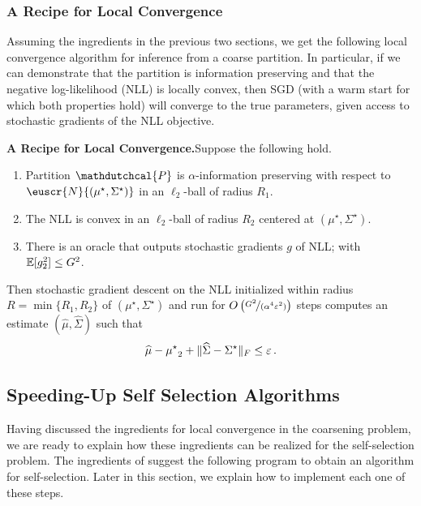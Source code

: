 \documentclass[11pt,letterpaper]{article}
\theoremstyle{plain}
\theoremstyle{definition}
\theoremstyle{remark}
\newcommand{\sinparen}[1]{\ensuremath{(#1)}}
\newcommand{\inparen}[1]{\ensuremath{\left(#1\right)}}
\newcommand{\snorm}[1]{\ensuremath{\ensuremath{\| #1 \|}}}
\let\norm\relax
\newcommand{\norm}[1]{\ensuremath{\left\lVert #1 \right\rVert}}
\newcommand{\E}{\operatornamewithlimits{\mathbb{E}}}
\newcommand{\Ex}{\E}
\newcommand{\nfrac}[2]{\nicefrac{#1}{#2}}
\newcommand{\eps}{\varepsilon}
\newcommand{\wh}[1]{\widehat{#1}}
\newcommand{\customcal}[1]{\euscr{#1}}
\newcommand{\cN}{\customcal{N}}
\newcommand{\hypo}[1]{\mathdutchcal{#1}}
\newcommand{\hyP}{\hypo{P}}
\newcommand{\normal}[2]{\cN{\inparen{#1,#2}}}
\newcommand{\muStar}{{\mu^\star}}
\newcommand{\SigmaStar}{{\Sigma^\star}}
\newcommand{\negsep}{\vspace{0mm}}
\begin{document}
\subsubsection{A Recipe for Local Convergence}\label{sec:localConvReceipe}
    Assuming the ingredients in the previous two sections, we get the following local convergence algorithm for inference from a coarse partition.
   In particular, if we can demonstrate that the partition is information preserving and that the negative log-likelihood (NLL) is locally convex, then SGD (with a warm start for which both properties hold) will converge to the true parameters, given access to stochastic gradients of the NLL objective.
    \begin{mdframed}
        \textbf{A Recipe for Local Convergence.}\quad Suppose the following hold.
        \vspace{-2mm}
        \begin{enumerate}[itemsep=-1.5pt,leftmargin=12pt]
            \item Partition $\hyP$ is $\alpha$-information preserving with respect to $\normal{\mu^\star}{\SigmaStar}$ in an $\ell_2$-ball of radius $R_{1}.$
            \item The NLL is convex in an $\ell_2$-ball of radius $R_2$ centered at $(\mu^\star, \SigmaStar)$.
            \item There is an oracle that outputs stochastic gradients $g$ of NLL; with $\Ex[\norm{g}_2^2]\leq G^2$. 
        \end{enumerate}
        Then stochastic gradient descent on the NLL initialized within radius $R  = \min\{R_1,R_2\}$ of $\inparen{\muStar,\SigmaStar}$
        and run for $O\inparen{\nfrac{G^2}{(\alpha^4\eps^2)}}$ steps
        computes an estimate $\sinparen{\wh{\mu},\wh{\Sigma}}$ such that 
        \[
            \norm{\wh{\mu} - \muStar}_2 + \snorm{\wh{\Sigma} - \SigmaStar}_F \leq \eps\,.
        \]
    \end{mdframed}

\negsep{}

\subsection{Speeding-Up Self Selection Algorithms}
\label{sec:reduction}   
{Having discussed the ingredients for local convergence in the coarsening problem}, we are ready to explain how these ingredients can be realized for the self-selection problem. The ingredients of  suggest the following program to obtain an algorithm for self-selection. 
Later in this section, we explain how to implement each one of these steps.
\end{document}
